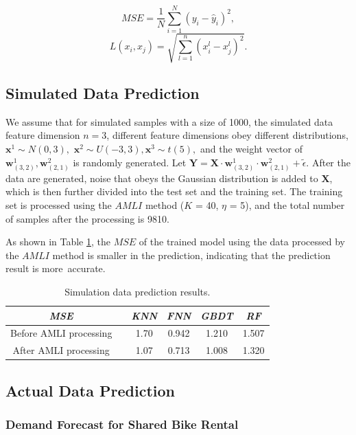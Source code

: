 \documentclass[mathematics,article,accept,pdftex,moreauthors]{Definitions/mdpi}
\begin{document}
$$ MSE = \frac{1}{N}\sum_{i=1}^{N}(y_{i}-\hat{y}_{i})^{2},$$
$$L(x_{i}, x_{j}) =\sqrt{\sum_{l=1}^{n}(x_{i}^{l} - x_{j}^{l})^{2}}.$$

\subsection{Simulated Data Prediction}

We assume that for simulated samples with a size of 1000, the simulated data feature dimension $n=3$, different feature dimensions obey different distributions, $\bm{x}^{1} \sim N(0,3),$ $\bm{x}^{2} \sim U(-3,3), \bm{x}^{3} \sim t(5),$  and the weight vector of $\bm{w}^{1}_{(3,2)}, \bm{w}^{2}_{(2,1)}$  is randomly generated. Let $\bm{Y}=\bm{X} \cdot \bm{w}_{(3,2)}^{1}\cdot\bm{w}^{2}_{(2,1)}+ \tilde{\epsilon}$. After the data are generated, noise that obeys the Gaussian distribution is added to $\bm{X}$, which is then further divided into the test set and the training set. The training set is processed using the $AMLI$ method ($K$ = 40, $\eta$ = 5), and the total number of samples after the processing is 9810.

As shown in Table \ref{tab3}, the $MSE$ of the trained model using the data processed by the $AMLI$ method is smaller in the prediction, indicating that the prediction result is more~accurate.

\begin{table}[H]
	
	\renewcommand{\tablename}{Table}
	\caption{Simulation data prediction results.}
	\label{tab3}
	{\renewcommand{\tabcolsep}{6.06mm}
		\small\begin{tabular}{cccccc}
			\toprule
			{\emph{\textbf{MSE}}}  & & {\emph{\textbf{KNN}}} & {\emph{\textbf{FNN}}} & {\emph{\textbf{GBDT}}} &{ \emph{\textbf{RF}}}    \\
			\midrule
			Before AMLI processing & & 1.70 & 0.942 & 1.210 & 1.507  \\
			After AMLI processing& & 1.07 & 0.713 & 1.008 & 1.320  \\
			\bottomrule
	\end{tabular}}
\end{table}


\subsection{Actual Data Prediction}
\subsubsection{ Demand Forecast for Shared Bike Rental}
\end{document}
